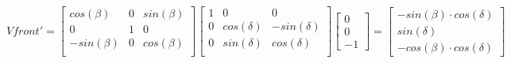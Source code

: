 $$
Vfront'=
\begin{bmatrix}
  cos(β) & 0 & sin(β) \\
  0 & 1 & 0 \\
  -sin(β) & 0 & cos(β) \\
\end{bmatrix}
\begin{bmatrix}
  1 & 0 & 0 \\
  0 & cos(δ) & -sin(δ) \\
  0 & sin(δ) & cos(δ) \\
\end{bmatrix}
\begin{bmatrix}
  0 \\
  0 \\
  -1
\end{bmatrix}
=
\begin{bmatrix}
  -sin(β) \cdot cos(δ) \\
  sin(δ) \\
  -cos(β) \cdot cos(δ)
\end{bmatrix}
$$